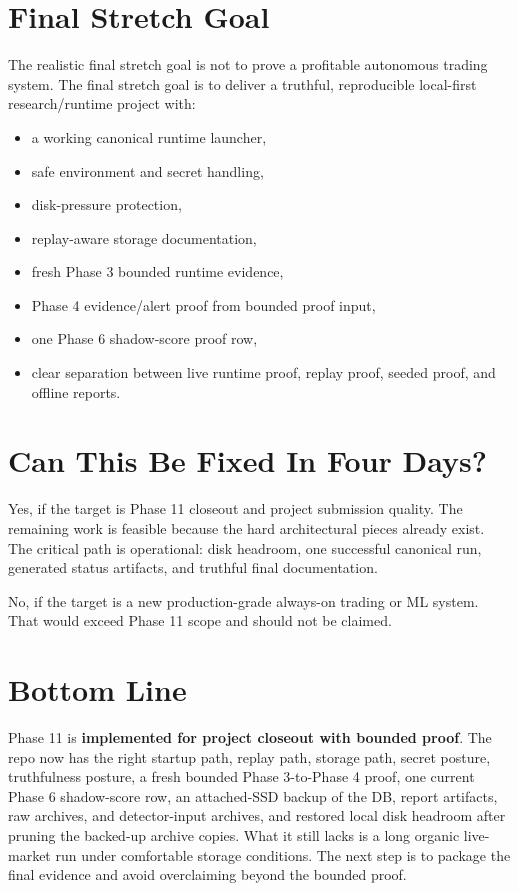\documentclass{article}
\begin{document}
\section*{Final Stretch Goal}
The realistic final stretch goal is not to prove a profitable autonomous trading system. The final stretch goal is to deliver a truthful, reproducible local-first research/runtime project with:
\begin{itemize}
\item a working canonical runtime launcher,
\item safe environment and secret handling,
\item disk-pressure protection,
\item replay-aware storage documentation,
\item fresh Phase 3 bounded runtime evidence,
\item Phase 4 evidence/alert proof from bounded proof input,
\item one Phase 6 shadow-score proof row,
\item clear separation between live runtime proof, replay proof, seeded proof, and offline reports.
\end{itemize}

\section*{Can This Be Fixed In Four Days?}
Yes, if the target is Phase 11 closeout and project submission quality. The remaining work is feasible because the hard architectural pieces already exist. The critical path is operational: disk headroom, one successful canonical run, generated status artifacts, and truthful final documentation.

No, if the target is a new production-grade always-on trading or ML system. That would exceed Phase 11 scope and should not be claimed.

\section*{Bottom Line}
Phase 11 is \textbf{implemented for project closeout with bounded proof}. The repo now has the right startup path, replay path, storage path, secret posture, truthfulness posture, a fresh bounded Phase 3-to-Phase 4 proof, one current Phase 6 shadow-score row, an attached-SSD backup of the DB, report artifacts, raw archives, and detector-input archives, and restored local disk headroom after pruning the backed-up archive copies. What it still lacks is a long organic live-market run under comfortable storage conditions. The next step is to package the final evidence and avoid overclaiming beyond the bounded proof.
\end{document}
